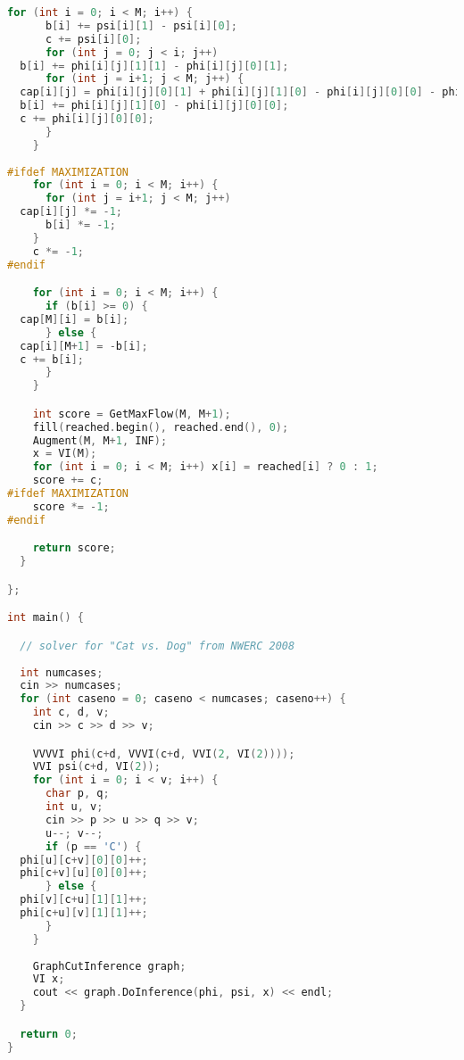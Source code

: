 \begin{lstlisting}[language=C++]
    for (int i = 0; i < M; i++) {
      b[i] += psi[i][1] - psi[i][0];
      c += psi[i][0];
      for (int j = 0; j < i; j++)
  b[i] += phi[i][j][1][1] - phi[i][j][0][1];
      for (int j = i+1; j < M; j++) {
  cap[i][j] = phi[i][j][0][1] + phi[i][j][1][0] - phi[i][j][0][0] - phi[i][j][1][1];
  b[i] += phi[i][j][1][0] - phi[i][j][0][0];
  c += phi[i][j][0][0];
      }
    }
    
#ifdef MAXIMIZATION
    for (int i = 0; i < M; i++) {
      for (int j = i+1; j < M; j++) 
  cap[i][j] *= -1;
      b[i] *= -1;
    }
    c *= -1;
#endif

    for (int i = 0; i < M; i++) {
      if (b[i] >= 0) {
  cap[M][i] = b[i];
      } else {
  cap[i][M+1] = -b[i];
  c += b[i];
      }
    }

    int score = GetMaxFlow(M, M+1);
    fill(reached.begin(), reached.end(), 0);
    Augment(M, M+1, INF);
    x = VI(M);
    for (int i = 0; i < M; i++) x[i] = reached[i] ? 0 : 1;
    score += c;
#ifdef MAXIMIZATION
    score *= -1;
#endif

    return score;
  }

};

int main() {

  // solver for "Cat vs. Dog" from NWERC 2008
  
  int numcases;
  cin >> numcases;
  for (int caseno = 0; caseno < numcases; caseno++) {
    int c, d, v;
    cin >> c >> d >> v;

    VVVVI phi(c+d, VVVI(c+d, VVI(2, VI(2))));
    VVI psi(c+d, VI(2));
    for (int i = 0; i < v; i++) {
      char p, q;
      int u, v;
      cin >> p >> u >> q >> v;
      u--; v--;
      if (p == 'C') {
  phi[u][c+v][0][0]++;
  phi[c+v][u][0][0]++;
      } else {
  phi[v][c+u][1][1]++;
  phi[c+u][v][1][1]++;
      }
    }
    
    GraphCutInference graph;
    VI x;
    cout << graph.DoInference(phi, psi, x) << endl;
  }

  return 0;
}

\end{lstlisting}

